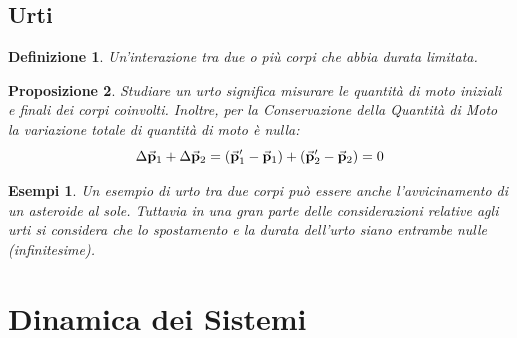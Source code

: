 \documentclass{article}
\newtheorem{defn}{Definizione}[section]
\newtheorem{prop}[defn]{Proposizione}
\newtheorem{example}{Esempi}[subsection]
\newcommand{\p}{\va{p}}
\begin{document}
\subsection{Urti}
\begin{defn}
Un'interazione tra due o più corpi che abbia durata limitata.
\end{defn}

\begin{prop}
Studiare un urto significa misurare le quantità di moto iniziali e finali dei corpi coinvolti. Inoltre, per la Conservazione della Quantità di Moto la variazione totale di quantità di moto è nulla:
\[\Delta\p_1+\Delta\p_2=(\p'_1-\p_1)+(\p'_2-\p_2)=0\]
\end{prop}

\begin{example}
Un esempio di urto tra due corpi può essere anche l'avvicinamento di un asteroide al sole. Tuttavia in una gran parte delle considerazioni relative agli urti si considera che lo spostamento e la durata dell'urto siano entrambe nulle (infinitesime).
\end{example}

\section{Dinamica dei Sistemi}
\end{document}
